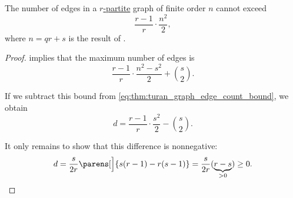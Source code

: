 \begin{corollary}\label{thm:turan_graph_edge_count_bound}
  The number of edges in a \hyperref[def:multipartite_graph]{\( r \)-partite} graph of finite order \( n \) cannot exceed
  \begin{equation}\label{eq:thm:turan_graph_edge_count_bound}
    \frac {r - 1} r \cdot \frac {n^2} 2,
  \end{equation}
  where \( n = qr + s \) is the result of .
\end{corollary}
\begin{proof}
   implies that the maximum number of edges is
  \begin{equation*}
    \frac {r - 1} r \cdot \frac {n^2 - s^2} 2 + \binom s 2.
  \end{equation*}

  If we subtract this bound from \eqref{eq:thm:turan_graph_edge_count_bound}, we obtain
  \begin{equation*}
    d = \frac {r - 1} r \cdot \frac {s^2} 2 - \binom s 2.
  \end{equation*}

  It only remains to show that this difference is nonnegative:
  \begin{equation*}
    d = \frac s {2r} \parens[\Big]{ s(r - 1) - r(s - 1) } = \frac s {2r} (\underbrace{r - s}_{> 0}) \geq 0.
  \end{equation*}
\end{proof}

